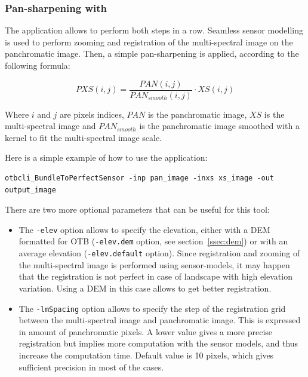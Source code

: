 \subsubsection{Pan-sharpening with \app}

The  application allows to
perform both steps in a row. Seamless sensor modelling is used to
perform zooming and registration of the multi-spectral image on the
panchromatic image. Then, a simple pan-sharpening is applied,
according to the following formula:

\begin{equation}
PXS(i,j) = \frac{PAN(i,j)}{PAN_{smooth}(i,j)} \cdot XS(i,j)
\end{equation}

Where $i$ and $j$ are pixels indices, $PAN$ is the panchromatic image,
$XS$ is the multi-spectral image and $PAN_{smooth}$ is the
panchromatic image smoothed with a kernel to fit the multi-spectral
image scale.

Here is a simple example of how to use the
 application:

\begin{verbatim}
otbcli_BundleToPerfectSensor -inp pan_image -inxs xs_image -out output_image
\end{verbatim}

There are two more optional parameters that can be useful for this
tool:
\begin{itemize}
\item The \verb?-elev? option allows to specify the elevation, either with
  a DEM formatted for OTB (\verb?-elev.dem? option, see 
  section~\ref{ssec:dem}) or with an average elevation (\verb?-elev.default? 
  option). Since registration
  and zooming of the multi-spectral image is performed using
  sensor-models, it may happen that the registration is not perfect in
  case of landscape with high elevation variation. Using a DEM in this
  case allows to get better registration.
\item The \verb?-lmSpacing? option allows to specify the step of the
  registration grid between the multi-spectral image and panchromatic
  image. This is expressed in amount of panchromatic pixels. A lower
  value gives a more precise registration but implies more computation
  with the sensor models, and thus increase the computation
  time. Default value is 10 pixels, which gives sufficient precision
  in most of the cases.
\end{itemize}

